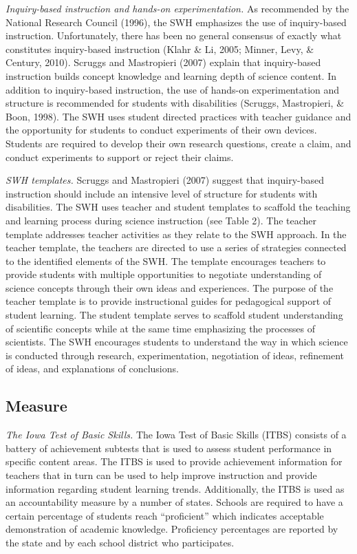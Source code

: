 \documentclass[11.5pt]{sig-alternate} %
\begin{document}
\begin{large}
\textit{Inquiry-based instruction and hands-on experimentation.} As recommended by the National Research Council (1996), the SWH emphasizes the use of inquiry-based instruction. Unfortunately, there has been no general consensus of exactly what constitutes inquiry-based instruction (Klahr \& Li, 2005; Minner, Levy, \& Century, 2010). Scruggs and Mastropieri (2007) explain that inquiry-based instruction builds concept knowledge and learning depth of science content. In addition to inquiry-based instruction, the use of hands-on experimentation and structure is recommended for students with disabilities (Scruggs, Mastropieri, \& Boon, 1998). The SWH uses student directed practices with teacher guidance and the opportunity for students to conduct experiments of their own devices. Students are required to develop their own research questions, create a claim, and conduct experiments to support or reject their claims.

\textit{SWH templates.} Scruggs and Mastropieri (2007) suggest that inquiry-based instruction should include an intensive level of structure for students with disabilities. The SWH uses teacher and student templates to scaffold the teaching and learning process during science instruction (see Table 2). The teacher template addresses teacher activities as they relate to the SWH approach. In the teacher template, the teachers are directed to use a series of strategies connected to the identified elements of the SWH. The template encourages teachers to provide students with multiple opportunities to negotiate understanding of science concepts through their own ideas and experiences. The purpose of the teacher template is to provide instructional guides for pedagogical support of student learning. The student template serves to scaffold student understanding of scientific concepts while at the same time emphasizing the processes of scientists. The SWH encourages students to understand the way in which science is conducted through research, experimentation, negotiation of ideas, refinement of ideas, and explanations of conclusions.

\subsection*{Measure}
\textit{The Iowa Test of Basic Skills.} The Iowa Test of Basic Skills (ITBS) consists of a battery of achievement subtests that is used to assess student performance in specific content areas. The ITBS is used to provide achievement information for teachers that in turn can be used to help improve instruction and provide information regarding student learning trends. Additionally, the ITBS is used as an accountability measure by a number of states. Schools are required to have a certain percentage of students reach “proficient” which indicates acceptable demonstration of academic knowledge. Proficiency percentages are reported by the state and by each school district who participates.


\end{large}
\end{document}

